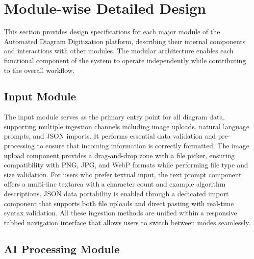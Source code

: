 
\section{Module-wise Detailed Design}
\label{sec:modules}

\justifying
This section provides design specifications for each major module of the Automated Diagram Digitization platform, describing their internal components and interactions with other modules. The modular architecture enables each functional component of the system to operate independently while contributing to the overall workflow.

\subsection{Input Module}

\justifying
The input module serves as the primary entry point for all diagram data, supporting multiple ingestion channels including image uploads, natural language prompts, and JSON imports. It performs essential data validation and pre-processing to ensure that incoming information is correctly formatted. The image upload component provides a drag-and-drop zone with a file picker, ensuring compatibility with PNG, JPG, and WebP formats while performing file type and size validation. For users who prefer textual input, the text prompt component offers a multi-line textarea with a character count and example algorithm descriptions. JSON data portability is enabled through a dedicated import component that supports both file uploads and direct pasting with real-time syntax validation. All these ingestion methods are unified within a responsive tabbed navigation interface that allows users to switch between modes seamlessly.

\subsection{AI Processing Module}

